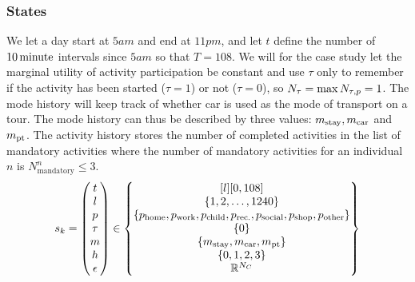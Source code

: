 \subsubsection{States}
We let a day start at $5\unit{am}$ and end at $11\unit{pm}$, and let $t$ define the number of $10\, \mathrm{minute}$ intervals since $5\unit{am}$ so that $T=108$.
We will for the case study let the marginal utility of activity participation be constant and use $\tau$ only to remember if the activity has been started ($\tau=1$) or not ($\tau=0$), so $N_\tau=\max{N_{\tau,p}}=1$. The mode history will keep track of whether car is used as the mode of transport on a tour. The mode history can thus be described by three values: $m_{\text{stay}},m_{\text{car}}$ and $m_{\text{pt}}$. The activity history stores the number of completed activities in the list of mandatory activities where the number of mandatory activities for an individual $n$ is $N^n_\text{mandatory}\leq 3$. 
\begin{equation}
\s{k} = \begin{pmatrix}
t \\
l \\
p \\
\atime\\
m \\
\amem \\
\epsilon
\end{pmatrix}
\in
\begin{Bmatrix*}[l]
[0,108] \\
\{1,2,\dots, 1240\} \\
\{ \p{home},\p{work},\p{child},\p{rec.},\p{social},\p{shop},\p{other}\}  \\
\{0\} \\
\{m_{\text{stay}},\m{car},\m{pt} \}\\
\{0,1,2,3\}\\
\rr^{N_C}
\end{Bmatrix*}
\end{equation}

